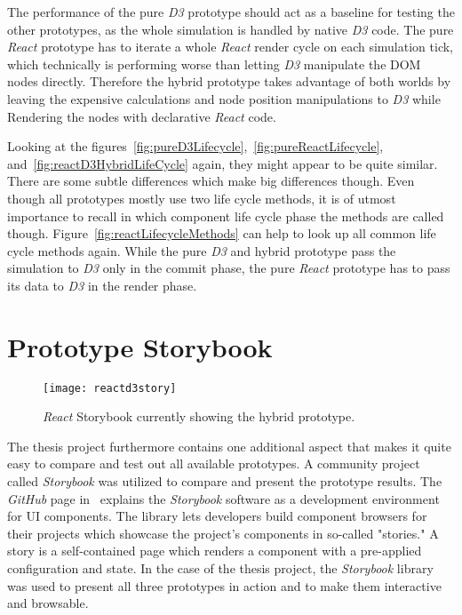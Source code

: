 The performance of the pure \emph{D3} prototype should act as a baseline for testing the other prototypes, as the whole simulation is handled by native \emph{D3} code. The pure \emph{React} prototype has to iterate a whole \emph{React} render cycle on each simulation tick, which technically is performing worse than letting \emph{D3} manipulate the DOM nodes directly. Therefore the hybrid prototype takes advantage of both worlds by leaving the expensive calculations and node position manipulations to \emph{D3} while Rendering the nodes with declarative \emph{React} code.

Looking at the figures~\ref{fig:pureD3Lifecycle},~\ref{fig:pureReactLifecycle}, and~\ref{fig:reactD3HybridLifeCycle} again, they might appear to be quite similar. There are some subtle differences which make big differences though. Even though all prototypes mostly use two life cycle methods, it is of utmost importance to recall in which component life cycle phase the methods are called though. Figure~\ref{fig:reactLifecycleMethods} can help to look up all common life cycle methods again. While the pure \emph{D3} and hybrid prototype pass the simulation to \emph{D3} only in the commit phase, the pure \emph{React} prototype has to pass its data to \emph{D3} in the render phase.

\section{Prototype Storybook}

\begin{figure}
  \centering
  \texttt{[image: reactd3story]}
  \caption{\emph{React} Storybook currently showing the hybrid prototype.}
  \label{fig:reactD3stroy}
\end{figure}

The thesis project furthermore contains one additional aspect that makes it quite easy to compare and test out all available prototypes. A community project called \emph{Storybook} was utilized to compare and present the prototype results. The \emph{GitHub} page in~\cite{ReactStorybook} explains the \emph{Storybook} software as a development environment for UI components. The library lets developers build component browsers for their projects which showcase the project's components in so-called "stories." A story is a self-contained page which renders a component with a pre-applied configuration and state. In the case of the thesis project, the \emph{Storybook} library was used to present all three prototypes in action and to make them interactive and browsable.

